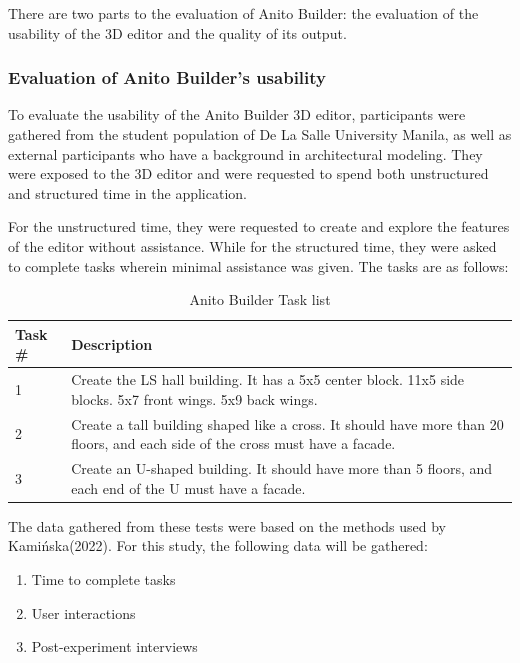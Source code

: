 \documentclass[manuscript,screen,12pt]{article}
\begin{document}
There are two parts to the evaluation of Anito Builder: the evaluation of the usability of the 3D editor and the quality of its output.

\subsubsection{Evaluation of Anito Builder's usability}

To evaluate the usability of the Anito Builder 3D editor, participants were gathered from the student population of De La Salle University Manila, as well as external participants who have a background in architectural modeling. They were exposed to the 3D editor and were requested to spend both unstructured and structured time in the application.

For the unstructured time, they were requested to create and explore the features of the editor without assistance. While for the structured time, they were asked to complete tasks wherein minimal assistance was given. The tasks are as follows:

\begin{table}[h!]
	\centering
	\caption{Anito Builder Task list}
	\begin{tabular}{|p{3cm}|p{10cm}|}
		\hline
		\textbf{Task \#} & \textbf{Description} \\
		\hline
		1 & Create the LS hall building. It has a 5x5 center block. 11x5 side blocks. 5x7 front wings. 5x9 back wings. \\
		\hline
		2 & Create a tall building shaped like a cross. It should have more than 20 floors, and each side of the cross must have a facade. \\
		\hline
		3 & Create an U-shaped building. It should have more than 5 floors, and each end of the U must have a facade.\\
		\hline
	\end{tabular}
\end{table}

The data gathered from these tests were based on the methods used by Kamińska(2022). For this study, the following data will be gathered:

\begin{enumerate}
    \item Time to complete tasks
    \item User interactions
    \item Post-experiment interviews
\end{enumerate}
\end{document}

